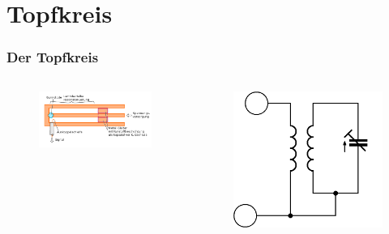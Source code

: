 \section{Topfkreis}
\begin{frame}
  \frametitle{Der Topfkreis}
  \begin{columns}
    \begin{figure}
      \includegraphics[width=\textwidth,height=.25\textheight,keepaspectratio]{a10/500px-Topfkreis.png}
    \end{figure}
    \begin{figure}
      \includegraphics[width=\textwidth,height=.25\textheight,keepaspectratio]{a10/Topfkreis-ESB.png}

\end{figure}
\end{columns}
\end{frame}
